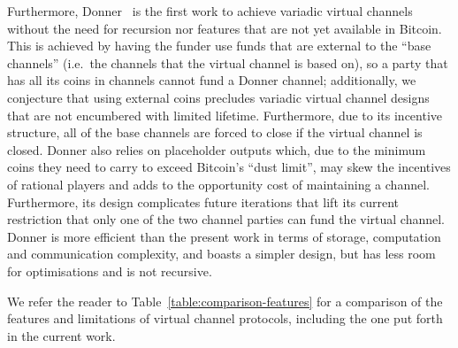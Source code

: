   Furthermore, Donner~\cite{donner} is the first work to achieve variadic
  virtual channels without the need for recursion nor features that are not yet
  available in Bitcoin. This is achieved by having the funder use funds that are
  external to the ``base channels'' (i.e.\ the channels that the virtual channel
  is based on), so a party that has all its coins in channels cannot fund a
  Donner channel; additionally, we conjecture that using external coins
  precludes variadic virtual channel designs that are not encumbered with
  limited lifetime. Furthermore, due to its incentive structure, all of the
  base channels are forced to close if the virtual channel is closed.
  Donner also relies on placeholder outputs
  which, due to the minimum coins they need to carry to exceed Bitcoin's ``dust
  limit'', may skew the incentives of rational players and adds to the
  opportunity cost of maintaining a channel. Furthermore, its design complicates
  future iterations that lift its current restriction that only one of the two
  channel parties can fund the virtual channel. Donner is more efficient than
  the present work in terms of storage, computation and communication
  complexity, and boasts a simpler design, but has less room for optimisations
  and is not recursive.

  We refer the reader to Table~\ref{table:comparison-features} for a comparison of the
  features and limitations of virtual channel protocols, including the one put
  forth in the current work.

